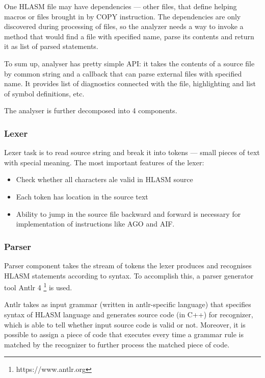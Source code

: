 One HLASM file may have dependencies --- other files, that define helping macros or files brought in by COPY instruction. The dependencies are only discovered during processing of files, so the analyzer needs a way to invoke a method that would find a file with specified name, parse its contents and return it as list of parsed statements.

To sum up, analyser has pretty simple API: it takes the contents of a source file by common string and a callback that can parse external files with specified name. It provides list of diagnostics connected with the file, highlighting and list of symbol definitions, etc.

The analyser is further decomposed into 4 components.

\subsubsection{Lexer}

Lexer task is to read source string and break it into tokens --- small pieces of text with special meaning. The most important features of the lexer:
\begin{itemize}
	\item Check whether all characters ale valid in HLASM source
	\item Each token has location in the source text
	\item Ability to jump in the source file backward and forward is necessary for implementation of instructions like AGO and AIF.
\end{itemize}

\subsubsection{Parser}

Parser component takes the stream of tokens the lexer produces and recognises HLASM statements according to syntax. To accomplish this, a parser generator tool Antlr 4 \footnote{https://www.antlr.org} is used.

Antlr takes as input grammar (written in antlr-specific language) that specifies syntax of HLASM language and generates source code (in C++) for recognizer, which is able to tell whether input source code is valid or not. Moreover, it is possible to assign a piece of code that executes every time a grammar rule is matched by the recognizer to further process the matched piece of code.




